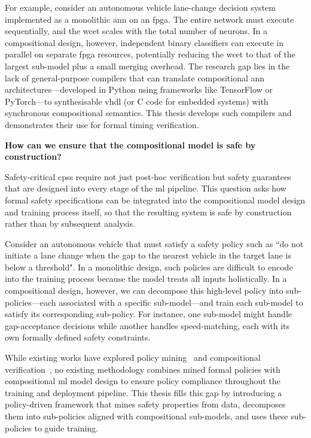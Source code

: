 \begin{questions}
For example, consider an autonomous vehicle lane-change decision system implemented as a monolithic \gls{ann} on an \gls{fpga}. The entire network must execute sequentially, and the \gls{wcet} scales with the total number of neurons. In a compositional design, however, independent binary classifiers can execute in parallel on separate \gls{fpga} resources, potentially reducing the \gls{wcet} to that of the largest sub-model plus a small merging overhead. The research gap lies in the lack of general-purpose compilers that can translate compositional \gls{ann} architectures---developed in Python using frameworks like TensorFlow or PyTorch---to synthesisable \gls{vhdl} (or C code for embedded systems) with synchronous compositional semantics. This thesis develops such compilers and demonstrates their use for formal timing verification.


\item \textbf{How can we ensure that the compositional model is safe by construction?}
\label{rq:safe_construction}

Safety-critical \glspl{cps} require not just post-hoc verification but safety guarantees that are designed into every stage of the \gls{ml} pipeline. This question asks how formal safety specifications can be integrated into the compositional model design and training process itself, so that the resulting system is safe by construction rather than by subsequent analysis.

Consider an autonomous vehicle that must satisfy a safety policy such as ``do not initiate a lane change when the gap to the nearest vehicle in the target lane is below a threshold". In a monolithic design, such policies are difficult to encode into the training process because the model treats all inputs holistically. In a compositional design, however, we can decompose this high-level policy into sub-policies---each associated with a specific sub-model---and train each sub-model to satisfy its corresponding sub-policy. For instance, one sub-model might handle gap-acceptance decisions while another handles speed-matching, each with its own formally defined safety constraints.

While existing works have explored policy mining~\cite{10.5555/1625015.1625078, panda_explainable_2024} and compositional verification~\cite{ivanov_compositional_2021, pasareanu_compositional_2018}, no existing methodology combines mined formal policies with compositional \gls{ml} model design to ensure policy compliance throughout the training and deployment pipeline. This thesis fills this gap by introducing a policy-driven framework that mines safety properties from data, decomposes them into sub-policies aligned with compositional sub-models, and uses these sub-policies to guide training.



\end{questions}
